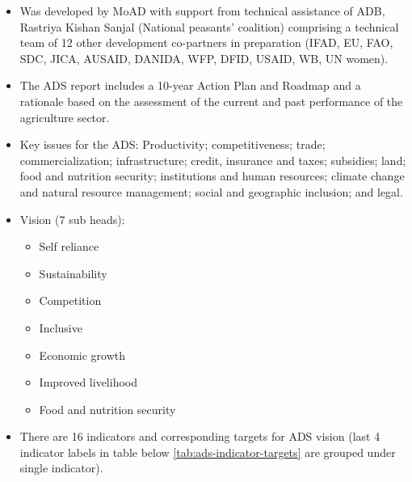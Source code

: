 \documentclass[
  openany]{book}
\providecommand{\tightlist}{%
  \setlength{\itemsep}{0pt}\setlength{\parskip}{0pt}}
\begin{document}
\begin{itemize}
\item
  Was developed by MoAD with support from technical assistance of ADB, Rastriya Kishan Sanjal (National peasants' coalition) comprising a technical team of 12 other development co-partners in preparation (IFAD, EU, FAO, SDC, JICA, AUSAID, DANIDA, WFP, DFID, USAID, WB, UN women).
\item
  The ADS report includes a 10-year Action Plan and Roadmap and a rationale based on the assessment of the current and past performance of the agriculture sector.
\item
  Key issues for the ADS: Productivity; competitiveness; trade; commercialization; infrastructure; credit, insurance and taxes; subsidies; land; food and nutrition security; institutions and human resources; climate change and natural resource management; social and geographic inclusion; and legal.
\item
  Vision (7 sub heads):

  \begin{itemize}
  \tightlist
  \item
    Self reliance
  \item
    Sustainability
  \item
    Competition
  \item
    Inclusive
  \item
    Economic growth
  \item
    Improved livelihood
  \item
    Food and nutrition security
  \end{itemize}
\item
  There are 16 indicators and corresponding targets for ADS vision (last 4 indicator labels in table below \ref{tab:ads-indicator-targets} are grouped under single indicator).
\end{itemize}

\begingroup\fontsize{6}{8}\selectfont
\end{document}
